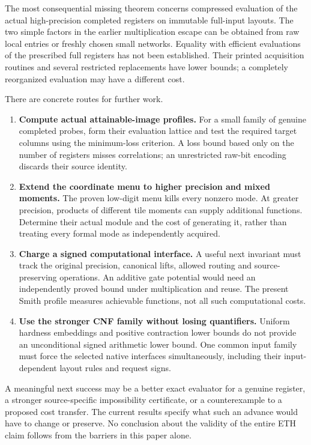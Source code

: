 \documentclass[
  11pt,
]{article}
\providecommand{\tightlist}{%
  \setlength{\itemsep}{0pt}\setlength{\parskip}{0pt}}
\begin{document}
The most consequential missing theorem concerns compressed evaluation of
the actual high-precision completed registers on immutable full-input
layouts. The two simple factors in the earlier multiplication escape can
be obtained from raw local entries or freshly chosen small networks.
Equality with efficient evaluations of the prescribed full registers has
not been established. Their printed acquisition routines and several
restricted replacements have lower bounds; a completely reorganized
evaluation may have a different cost.

There are concrete routes for further work.

\begin{enumerate}
\def\labelenumi{\arabic{enumi}.}
\tightlist
\item
  \textbf{Compute actual attainable-image profiles.} For a small family
  of genuine completed probes, form their evaluation lattice and test
  the required target columns using the minimum-loss criterion. A loss
  bound based only on the number of registers misses correlations; an
  unrestricted raw-bit encoding discards their source identity.
\item
  \textbf{Extend the coordinate menu to higher precision and mixed
  moments.} The proven low-digit menu kills every nonzero mode. At
  greater precision, products of different tile moments can supply
  additional functions. Determine their actual module and the cost of
  generating it, rather than treating every formal mode as independently
  acquired.
\item
  \textbf{Charge a signed computational interface.} A useful next
  invariant must track the original precision, canonical lifts, allowed
  routing and source-preserving operations. An additive gate potential
  would need an independently proved bound under multiplication and
  reuse. The present Smith profile measures achievable functions, not
  all such computational costs.
\item
  \textbf{Use the stronger CNF family without losing quantifiers.}
  Uniform hardness embeddings and positive contraction lower bounds do
  not provide an unconditional signed arithmetic lower bound. One common
  input family must force the selected native interfaces simultaneously,
  including their input-dependent layout rules and request signs.
\end{enumerate}

A meaningful next success may be a better exact evaluator for a genuine
register, a stronger source-specific impossibility certificate, or a
counterexample to a proposed cost transfer. The current results specify
what such an advance would have to change or preserve. No conclusion
about the validity of the entire ETH claim follows from the barriers in
this paper alone.
\end{document}
